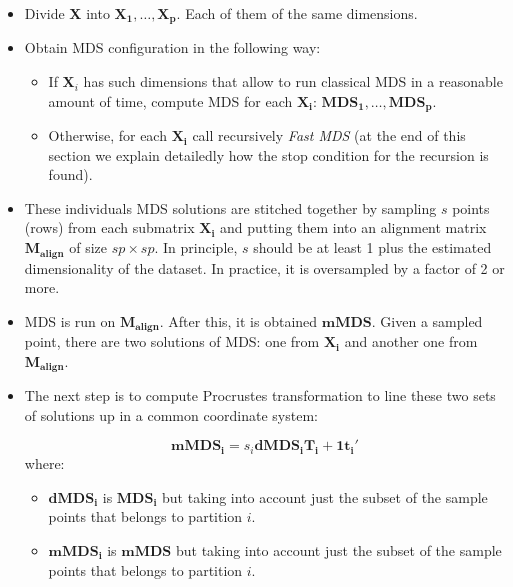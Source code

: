 \documentclass[11pt]{report}
\begin{document}
\begin{itemize}

\item Divide \textbf{X} into $\mathbf{X_1},\dots, \mathbf{X_p}$. Each of them 
of the same dimensions.

\item Obtain MDS configuration in the following way:

\begin{itemize}

\item If $\mathbf{X}_i$ has such dimensions that allow to run classical MDS in
a reasonable amount of time, compute MDS for each $\mathbf{X_i}$: 
$\mathbf{MDS_1}, \dots, \mathbf{MDS_p}$. 

\item Otherwise, for each $\mathbf{X_i}$ call recursively \textit{Fast MDS} 
(at the end of this section we explain detailedly how the stop condition for
the recursion is found).

\end{itemize}

\item These individuals MDS solutions are stitched together by sampling 
$s$ points (rows) from each submatrix $\mathbf{X_i}$ and putting them into 
an alignment matrix $\mathbf{M_{align}}$ of size $sp \times sp$. In principle, 
$s$ should be at least 1 plus the estimated dimensionality of the dataset. 
In practice, it is oversampled by a factor of 2 or more. 

\item MDS is run on $\mathbf{M_{align}}$. After this, it is obtained
$\mathbf{mMDS}$. Given a sampled point, there are two solutions of MDS: 
one from $\mathbf{X_i}$ and another one from $\mathbf{M_{align}}$.

\item The next step is to compute Procrustes transformation to  line  
these two sets of solutions up in a common coordinate system:

\[
\mathbf{mMDS_i} = s_i \mathbf{dMDS_i} \mathbf{T_i} + \mathbf{1t_i}'
\]
where:

\begin{itemize}

\item $\mathbf{dMDS_i}$ is $\mathbf{MDS_i}$ but taking into account just
the subset of the sample points that belongs to partition $i$.

\item $\mathbf{mMDS_i}$ is $\mathbf{mMDS}$ but taking into account just
the subset of the sample points that belongs to partition $i$.
\end{itemize}


\end{itemize}
\end{document}
